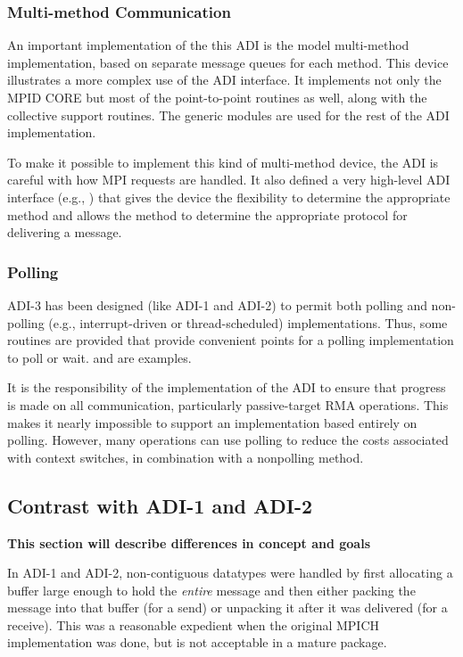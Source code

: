 \documentclass{article}
\begin{document}
\subsubsection{Multi-method Communication}
An important implementation of the this ADI is the model multi-method
implementation, based on separate message queues for each method.
This device illustrates a more complex use of the ADI interface.  It
implements not only the MPID CORE but most of the point-to-point
routines as well, along with the collective support routines.  The
generic modules are used for the rest of the ADI implementation.

To make it possible to implement this kind of multi-method device, the
ADI is careful with how MPI requests are handled.  It also defined a
very high-level ADI interface (e.g., ) that gives the
device the flexibility to determine the appropriate method and allows
the method to determine the appropriate protocol for delivering a message.

\subsubsection{Polling}
ADI-3 has been designed (like ADI-1 and ADI-2) to permit both polling and
non-polling (e.g., interrupt-driven or thread-scheduled) implementations.
Thus, some routines are provided that provide convenient points for a polling
implementation to poll or wait.   and
 are examples.

It is the responsibility of the implementation of the ADI to ensure that
progress is made on all communication, particularly passive-target RMA
operations.  This makes it nearly impossible to support an implementation
based entirely on polling.  However, many operations can use polling to reduce
the costs associated with context switches, in combination with a nonpolling
method.

\subsection{Contrast with ADI-1 and ADI-2}
\label{sec-historical}
\textbf{This section will describe differences in concept and goals}

In ADI-1 and ADI-2, non-contiguous datatypes were handled by first
allocating a buffer large enough to hold the \emph{entire} message and
then either packing the message into that buffer (for a send) or
unpacking it after it was delivered (for a receive).  This was a
reasonable expedient when the original MPICH implementation was done,
but is not acceptable in a mature package.
\end{document}
